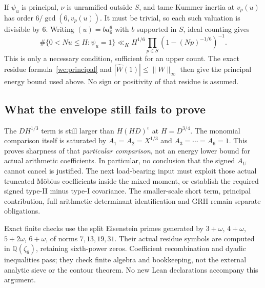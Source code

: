 If $\psi_u$ is principal, $\nu$ is unramified outside $S$, and tame
Kummer inertia at $v_p(u)$ has order $6/\gcd(6,v_p(u))$.
It must be trivial, so each such valuation is divisible by $6$.
Writing $(u)=ba_6^6$ with $b$ supported in $S$, ideal counting gives
\[
 \#\{0<Nu\le H:\psi_u=1\}
 \ll_K H^{1/6}\prod_{p\in S}(1-(Np)^{-1/6})^{-1}.
\]
This is only a necessary condition, sufficient for an upper count.
The exact residue formula~\eqref{wc:principal} and
$|\widehat W(1)|\le\|W\|_\infty$ then give the principal energy
bound used above. No sign or positivity of that residue is assumed.

\subsection{What the envelope still fails to prove}
The $DH^{1/3}$ term is still larger than $H(HD)^\varepsilon$ at
$H=D^{3/4}$. The monomial comparison itself is saturated by
$A_1=A_2=X^{1/3}$ and $A_3=\cdots=A_6=1$.
This proves sharpness of that \emph{particular comparison}, not an
energy lower bound for actual arithmetic coefficients. In particular,
no conclusion that the signed $A_U$ cannot cancel is justified.
The next load-bearing input must exploit those actual truncated M\"obius
coefficients inside the mixed moment, or establish the required signed
type-II minus type-I covariance. The smaller-scale short term, principal
contribution, full arithmetic determinant identification and GRH remain
separate obligations.

Exact finite checks use the split Eisenstein primes generated by
$3+\omega$, $4+\omega$, $5+2\omega$, $6+\omega$, of norms
$7,13,19,31$. Their actual residue symbols are computed in
$\mathbb Q(\zeta_6)$, retaining sixth-power zeros. Coefficient
recombination and dyadic inequalities pass; they check finite algebra
and bookkeeping, not the external analytic sieve or the contour theorem.
No new Lean declarations accompany this argument.
